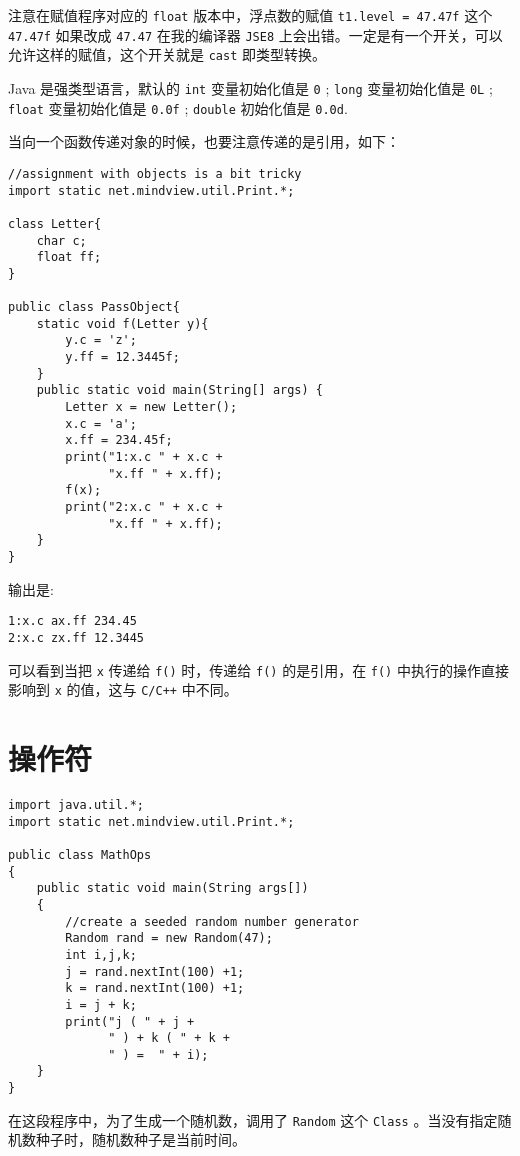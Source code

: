 \documentclass[10pt,a4paper,UTF8]{article}
\begin{document}
注意在赋值程序对应的 \texttt{float} 版本中，浮点数的赋值 \texttt{t1.level = 47.47f} 这个 \texttt{47.47f} 如果改成 \texttt{47.47} 在我的编译器 \texttt{JSE8} 上会出错。一定是有一个开关，可以允许这样的赋值，这个开关就是 \texttt{cast} 即类型转换。

Java 是强类型语言，默认的 \texttt{int} 变量初始化值是 \texttt{0} ; \texttt{long} 变量初始化值是 \texttt{0L} ; \texttt{float} 变量初始化值是 \texttt{0.0f} ; \texttt{double} 初始化值是 \texttt{0.0d}.

当向一个函数传递对象的时候，也要注意传递的是引用，如下：
\lstset{language=java,label= ,caption= ,captionpos=b,firstnumber=1,numbers=left}
\begin{lstlisting}
//assignment with objects is a bit tricky
import static net.mindview.util.Print.*;

class Letter{
    char c;
    float ff;
}

public class PassObject{
    static void f(Letter y){
        y.c = 'z';
        y.ff = 12.3445f;
    }
    public static void main(String[] args) {
        Letter x = new Letter();
        x.c = 'a';
        x.ff = 234.45f;
        print("1:x.c " + x.c +
              "x.ff " + x.ff);
        f(x);
        print("2:x.c " + x.c +
              "x.ff " + x.ff);
    }
}
\end{lstlisting}

输出是:
\begin{verbatim}
1:x.c ax.ff 234.45
2:x.c zx.ff 12.3445
\end{verbatim}
可以看到当把 \texttt{x} 传递给 \texttt{f()} 时，传递给 \texttt{f()} 的是引用，在 \texttt{f()} 中执行的操作直接影响到 \texttt{x} 的值，这与 \texttt{C/C++} 中不同。
\section{操作符}
\label{sec:orgheadline2}



\lstset{language=java,label= ,caption= ,captionpos=b,firstnumber=1,numbers=left}
\begin{lstlisting}
import java.util.*;
import static net.mindview.util.Print.*;

public class MathOps
{
    public static void main(String args[])
    {
        //create a seeded random number generator
        Random rand = new Random(47);
        int i,j,k;
        j = rand.nextInt(100) +1;
        k = rand.nextInt(100) +1;
        i = j + k;
        print("j ( " + j +
              " ) + k ( " + k +
              " ) =  " + i);
    }
}
\end{lstlisting}
在这段程序中，为了生成一个随机数，调用了 \texttt{Random} 这个 \texttt{Class} 。当没有指定随机数种子时，随机数种子是当前时间。
\end{document}
